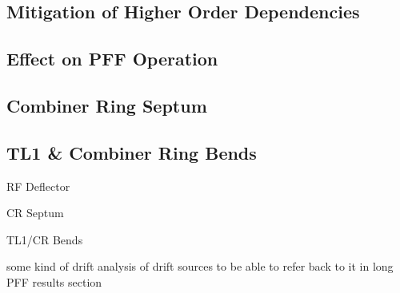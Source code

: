 \subsection{Mitigation of Higher Order Dependencies}
\label{ss:t566Mitigation}



\subsection{Effect on PFF Operation}
\label{ss:t566EffectPFF}



\subsection{Combiner Ring Septum}
\label{ss:crSeptum}

\subsection{TL1 \& Combiner Ring Bends}
\label{ss:crBends}


RF Deflector

CR Septum

TL1/CR Bends



some kind of drift analysis of drift sources to be able to refer back to it in long PFF results section



